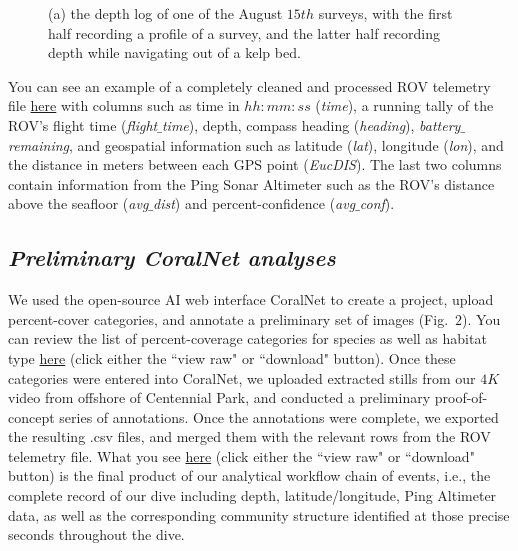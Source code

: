 \documentclass[11pt]{article}
\begin{document}
\begin{figure}[h!]
\centering
{}
\caption{
(a) the depth log of one of the August $15th$ surveys, with 
the first half recording a profile of a survey, and the latter half 
recording depth while navigating out of a kelp bed. 
}
\label{divelog}
\end{figure}

You can see an example of a completely cleaned and processed ROV 
telemetry file 
\href{https://github.com/zhrandell/Seattle_Aquarium_ROV_telemetry_imagery_analysis/blob/main/ROV_telemetry/Cleaned/2022-08-15_09-57-40.csv}{here}
 with columns such as time in $hh:mm:ss$ (\textit{time}), 
a running tally of the ROV's flight time (\textit{flight$\_$time}), 
depth, 
compass heading (\textit{heading}), 
\textit{battery$\_$remaining}, and 
geospatial information such as 
latitude (\textit{lat}),
longitude (\textit{lon}),
and the distance in meters between each GPS point (\textit{EucDIS}). 
The last two columns contain information from the Ping Sonar 
Altimeter such as the ROV's distance above the 
seafloor (\textit{avg$\_$dist}) and percent-confidence 
(\textit{avg$\_$conf}). 

\subsection{\textit{Preliminary CoralNet analyses}}
We used the open-source AI web interface CoralNet to create a project, upload percent-cover categories, and annotate a preliminary set of images (Fig.~$2$). 
You can review the list of percent-coverage categories for species as well as habitat type 
\href{https://github.com/zhrandell/Seattle_Aquarium_ROV_telemetry_imagery_analysis/blob/main/documents/CoralNet_Percent_Cover_Classifications.xlsx}{here} (click either the ``view raw" or ``download" button).
Once these categories were entered into CoralNet, we uploaded extracted stills from our $4K$ video from offshore of Centennial Park, and conducted a preliminary proof-of-concept series of annotations.
Once the annotations were complete, we exported the resulting .csv files, and merged them with the relevant rows from the ROV telemetry file. 
What you see 
\href{https://github.com/zhrandell/Seattle_Aquarium_ROV_telemetry_imagery_analysis/blob/15b0c253a3292df240f1559ae9e0f73d25d6be66/ROV_telemetry/Cleaned/Telemetry_and_CoralNet.xlsx}{here} (click either the ``view raw" or ``download" button)
 is the final product of our analytical workflow chain of events, i.e., the complete record of our dive including depth, latitude/longitude, Ping Altimeter data, as well as the corresponding community structure identified at those precise seconds throughout the dive.  
\end{document}
